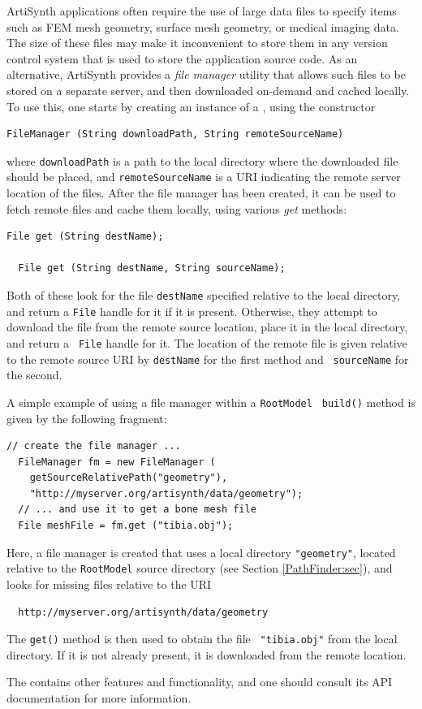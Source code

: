 ArtiSynth applications often require the use of large data files to
specify items such as FEM mesh geometry, surface mesh geometry, or
medical imaging data. The size of these files may make it inconvenient
to store them in any version control system that is used to
store the application source code. As an alternative, ArtiSynth
provides a {\it file manager} utility that allows such files to be
stored on a separate server, and then downloaded on-demand and cached
locally. To use this, one starts by creating an instance of a
, using the constructor
\begin{lstlisting}[]
  FileManager (String downloadPath, String remoteSourceName)
\end{lstlisting}
%
where {\tt downloadPath} is a path to the local directory where the
downloaded file should be placed, and {\tt remoteSourceName} is a URI
indicating the remote server location of the files.  After the file
manager has been created, it can be used to fetch remote files and
cache them locally, using various {\it get} methods:
\begin{lstlisting}[]
  File get (String destName);

  File get (String destName, String sourceName);
\end{lstlisting}
%
Both of these look for the file {\tt destName} specified relative to
the local directory, and return a {\tt File} handle for it if it is
present. Otherwise, they attempt to download the file from the remote
source location, place it in the local directory, and return a {\tt
File} handle for it.
The location of the remote file is given relative to
the remote source URI by {\tt destName} for the first method and {\tt
sourceName} for the second.

A simple example of using a file manager within a {\tt RootModel} {\tt
build()} method is given by the following fragment:
%
\begin{lstlisting}[]
  // create the file manager ...
  FileManager fm = new FileManager (
    getSourceRelativePath("geometry"), 
    "http://myserver.org/artisynth/data/geometry");
  // ... and use it to get a bone mesh file
  File meshFile = fm.get ("tibia.obj");
\end{lstlisting}
%
Here, a file manager is created that uses a local directory {\tt "geometry"},
located relative to the {\tt RootModel} source directory (see Section
\ref{PathFinder:sec}), and looks for missing files relative to the URI
%
\begin{verbatim}
  http://myserver.org/artisynth/data/geometry
\end{verbatim}
%
The {\tt get()} method is then used to obtain the file {\tt
"tibia.obj"} from the local directory. If it is not already present,
it is downloaded from the remote location.

The  contains other features
and functionality, and one should consult its API documentation for
more information.

\ifdefined\maindoc
\else

\fi
